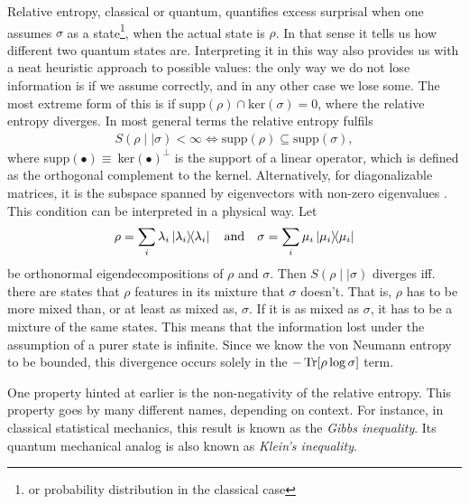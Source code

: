 Relative entropy, classical or quantum, quantifies excess surprisal when
one assumes $\sigma$ as a state\footnote{or probability distribution in the
classical case}, when the actual state is $\rho$. In that sense it tells us how
different two quantum states are. Interpreting it in this way also provides us
with a neat heuristic approach to possible values: the only way we do not lose
information is if we assume correctly, and in any other case we lose some. The
most extreme form of this is if $\mathrm{supp}(\rho)\cap\mathrm{ker}(\sigma)={0}$, where the
relative entropy diverges. In most general terms the relative entropy fulfils
\begin{align}\label{eq:inf-cond}
  S(\rho\mid\mid\sigma) < \infty \Longleftrightarrow \mathrm{supp}(\rho) \subseteq
  \mathrm{supp}(\sigma)
,\end{align}
where supp$(\bullet)\equiv\ $ker$(\bullet)^\perp$ is the support of a linear
operator, which is defined as the orthogonal complement to the kernel.
Alternatively, for diagonalizable matrices, it is the subspace spanned by
eigenvectors with non-zero eigenvalues
\cite{leditzkyRelativeEntropiesTheir2016,schumacherRelativeEntropyQuantum2000}.
This condition can be interpreted in a physical way. Let
\[
  \rho = \sum_i \lambda_i \dyad{\lambda_i} \quad{\text{and}} \quad
  \sigma = \sum_i \mu_i \dyad{\mu_i}
\]
be orthonormal eigendecompositions of $\rho$ and $\sigma$.
Then $S(\rho\mid\mid\sigma)$ diverges iff. there are states that $\rho$
features in its mixture that $\sigma$ doesn't. That is, $\rho$ has to be more
mixed than, or at least as mixed as, $\sigma$. If it is as mixed as
$\sigma$, it has to be a mixture of the same states. This means that the
information lost under the assumption of a purer state is infinite.
Since we know the von Neumann entropy to be bounded, this divergence occurs
solely in the $-\Tr[\rho\log\sigma]$ term. 

One property hinted at earlier is the non-negativity of the relative entropy.
This property goes by many different names, depending on context. For instance,
in classical statistical mechanics, this result is known as the \emph{Gibbs
inequality}. Its quantum mechanical analog is also known as \emph{Klein's
inequality}.
